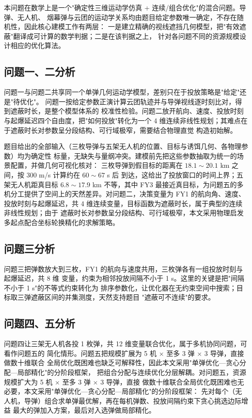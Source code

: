\documentclass[12pt, a4paper]{article}
\begin{document}
本问题在数学上是一个"确定性三维运动学仿真 + 连续/组合优化"的混合问题。导弹、无人机、
烟幕弹与云团的运动学关系均由题目给定参数唯一确定，不存在随机性，因此核心建模工作有两层：
一是建立精确的视线遮挡几何模型，把"有效遮蔽"翻译成可计算的数学判据；二是在该判据之上，
针对各问题不同的资源规模设计相应的优化算法。

\subsection{问题一、二分析}

问题一与问题二共享同一个单弹几何运动学模型，差别只在于投放策略是"给定"还是"待优化"。
问题一按给定参数正演计算云团轨迹并与导弹视线逐时刻比对，得到遮蔽时长，是整个模型体系的
校准性检验。问题二放开航向、速度、投放时刻与起爆延迟四个自由度，把"如何投放"转化为一个
4 维连续非线性规划；其难点在于遮蔽时长对参数呈分段结构、可行域极窄，需要结合物理直觉
构造初始解。

题目给出的全部输入（三枚导弹与五架无人机的位置、目标与诱饵几何、各物理参数）均为确定性
标量，无缺失与量纲冲突。建模前先把这些参数抽取为统一的场景配置，并做几何可视化核对：
三枚导弹到假目标的距离在 $18.1\sim20.1$ km 之间，按 $300$ m/s 计算约在 $60\sim67$ s 后
到达，这给出了投放窗口的时间上界；五架无人机距真目标 $6.8\sim17.9$ km 不等，其中 FY3
最接近真目标，为问题五的多机分工提供了空间上的天然差异。对问题二，决策变量为 FY1 的航向角、速度、
投放时刻与起爆延迟，共 4 维连续变量，目标函数为遮蔽时长，属于典型的连续非线性规划；由于
遮蔽时长对参数呈分段结构、可行域极窄，本文采用物理启发多起点配合坐标轮换精化的求解策略。
\subsection{问题三分析}

问题三把弹数放大到三枚，FY1 的航向与速度共用，三枚弹各有一组投放时刻与起爆延迟，共 8 维
变量，约束为相邻投放间隔不小于 1 s。这里的关键是把"间隔不小于 1 s"的不等式约束转化为
排序参数化，让优化器在无约束空间中搜索；目标取三弹遮蔽区间的并集测度，天然支持题目
"遮蔽可不连续"的要求。\subsection{问题四、五分析}

问题四让三架无人机各投 1 枚弹，共 12 维变量联合优化，属于多机协同问题，可看作问题五的
简化情形。问题五把规模扩展为 5 机 $\times$ 至多 3 弹 $\times$ 3 导弹，直接做数十维联合
全局优化既困难也缺乏可解释性，因此本文采用"单弹优化—贪心分配—局部精化"的分阶段框架，
把组合分配与连续优化分层解耦。对问题五，资源规模扩大为 5 机 $\times$ 至多 3 弹 $\times$ 3 导弹，直接
做数十维联合全局优化既困难也无必要，本文采用"单弹优化—贪心分配—局部精化"的分阶段框架：
先对每个（无人机，导弹）组合求单弹最优解，再在每机弹数、投放间隔约束下贪心挑选边际增益
最大的弹加入方案，最后对入选弹做局部精化。
\end{document}

